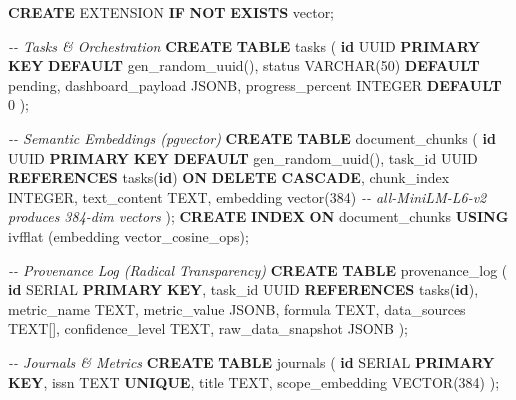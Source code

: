\documentclass[
]{article}
\newenvironment{Shaded}{}{}
\newcommand{\CommentTok}[1]{\textcolor[rgb]{0.38,0.63,0.69}{\textit{#1}}}
\newcommand{\ControlFlowTok}[1]{\textcolor[rgb]{0.00,0.44,0.13}{\textbf{#1}}}
\newcommand{\DataTypeTok}[1]{\textcolor[rgb]{0.56,0.13,0.00}{#1}}
\newcommand{\DecValTok}[1]{\textcolor[rgb]{0.25,0.63,0.44}{#1}}
\newcommand{\KeywordTok}[1]{\textcolor[rgb]{0.00,0.44,0.13}{\textbf{#1}}}
\newcommand{\NormalTok}[1]{#1}
\newcommand{\StringTok}[1]{\textcolor[rgb]{0.25,0.44,0.63}{#1}}
\begin{document}
\begin{Shaded}
\begin{Highlighting}[]
\KeywordTok{CREATE}\NormalTok{ EXTENSION }\ControlFlowTok{IF} \KeywordTok{NOT} \KeywordTok{EXISTS}\NormalTok{ vector;}

\CommentTok{{-}{-} Tasks \& Orchestration}
\KeywordTok{CREATE} \KeywordTok{TABLE}\NormalTok{ tasks (}
    \KeywordTok{id}\NormalTok{ UUID }\KeywordTok{PRIMARY} \KeywordTok{KEY} \KeywordTok{DEFAULT}\NormalTok{ gen\_random\_uuid(),}
\NormalTok{    status }\DataTypeTok{VARCHAR}\NormalTok{(}\DecValTok{50}\NormalTok{) }\KeywordTok{DEFAULT} \StringTok{\textquotesingle{}pending\textquotesingle{}}\NormalTok{,}
\NormalTok{    dashboard\_payload JSONB,}
\NormalTok{    progress\_percent }\DataTypeTok{INTEGER} \KeywordTok{DEFAULT} \DecValTok{0}
\NormalTok{);}

\CommentTok{{-}{-} Semantic Embeddings (pgvector)}
\KeywordTok{CREATE} \KeywordTok{TABLE}\NormalTok{ document\_chunks (}
    \KeywordTok{id}\NormalTok{ UUID }\KeywordTok{PRIMARY} \KeywordTok{KEY} \KeywordTok{DEFAULT}\NormalTok{ gen\_random\_uuid(),}
\NormalTok{    task\_id UUID }\KeywordTok{REFERENCES}\NormalTok{ tasks(}\KeywordTok{id}\NormalTok{) }\KeywordTok{ON} \KeywordTok{DELETE} \KeywordTok{CASCADE}\NormalTok{,}
\NormalTok{    chunk\_index }\DataTypeTok{INTEGER}\NormalTok{,}
\NormalTok{    text\_content TEXT,}
\NormalTok{    embedding vector(}\DecValTok{384}\NormalTok{)  }\CommentTok{{-}{-} all{-}MiniLM{-}L6{-}v2 produces 384{-}dim vectors}
\NormalTok{);}
\KeywordTok{CREATE} \KeywordTok{INDEX} \KeywordTok{ON}\NormalTok{ document\_chunks }\KeywordTok{USING}\NormalTok{ ivfflat (embedding vector\_cosine\_ops);}

\CommentTok{{-}{-} Provenance Log (Radical Transparency)}
\KeywordTok{CREATE} \KeywordTok{TABLE}\NormalTok{ provenance\_log (}
    \KeywordTok{id}\NormalTok{ SERIAL }\KeywordTok{PRIMARY} \KeywordTok{KEY}\NormalTok{,}
\NormalTok{    task\_id UUID }\KeywordTok{REFERENCES}\NormalTok{ tasks(}\KeywordTok{id}\NormalTok{),}
\NormalTok{    metric\_name TEXT,}
\NormalTok{    metric\_value JSONB,}
\NormalTok{    formula TEXT,}
\NormalTok{    data\_sources TEXT[],}
\NormalTok{    confidence\_level TEXT,}
\NormalTok{    raw\_data\_snapshot JSONB}
\NormalTok{);}

\CommentTok{{-}{-} Journals \& Metrics}
\KeywordTok{CREATE} \KeywordTok{TABLE}\NormalTok{ journals (}
    \KeywordTok{id}\NormalTok{ SERIAL }\KeywordTok{PRIMARY} \KeywordTok{KEY}\NormalTok{,}
\NormalTok{    issn TEXT }\KeywordTok{UNIQUE}\NormalTok{,}
\NormalTok{    title TEXT,}
\NormalTok{    scope\_embedding VECTOR(}\DecValTok{384}\NormalTok{)}
\NormalTok{);}
\end{Highlighting}
\end{Shaded}
\end{document}
